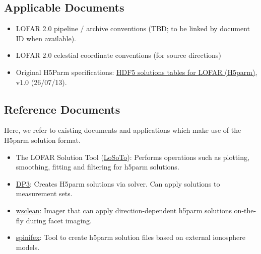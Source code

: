 \documentclass[a4paper,10pt,bibtotoc]{scrartcl}
\begin{document}
\subsection{Applicable Documents}
\begin{itemize}
  \item LOFAR 2.0 pipeline / archive conventions (TBD; to be linked by document ID when available).
  \item LOFAR 2.0 celestial coordinate conventions (for source directions)
  \item Original H5Parm specifications: \href{https://docs.google.com/document/d/1pjDxRywhRO5HRuqciGYO2TWD-Ufu_5nxwFA3b_YnJJg/edit?tab=t.0#heading=h.uae9zka4fdfd}{HDF5 solutions tables for LOFAR (H5parm)}, v1.0 (26/07/13).
\end{itemize}

\subsection{Reference Documents}
Here, we refer to existing documents and applications which make use of the H5parm solution format.
\begin{itemize}
  \item The LOFAR Solution Tool (\href{https://github.com/revoltek/losoto}{LoSoTo}): Performs operations such as plotting, smoothing, fitting and filtering for h5parm solutions. 
  \item \href{https://dp3.readthedocs.io/en/latest/steps/DDECal.html}{DP3}: Creates H5parm solutions via solver. Can apply solutions to measurement sets.
  \item \href{https://wsclean.readthedocs.io/en/latest/}{wsclean}: Imager that can apply direction-dependent h5parm solutions on-the-fly during facet imaging.
  \item \href{https://git.astron.nl/RD/spinifex}{spinifex}: Tool to create h5parm solution files based on external ionosphere models.

 
\end{itemize}
\end{document}
